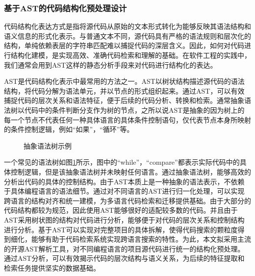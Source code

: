 \documentclass[UTF8,a4paper,12pt]{ctexart}
\numberwithin{equation}{section}
\begin{document}
\subsubsection{基于AST的代码结构化预处理设计}
代码结构化表达方式是指将源代码从原始的文本形式转化为能够反映其语法结构和语义信息的形式化表示。与普通文本不同，源代码具有严格的语法规则和层次化的结构，单纯依赖表层的字符串匹配难以捕捉代码的深层含义。因此，如何对代码进行结构化建模，是实现高效、准确代码检索和理解的基础。在软件工程的实践中，我们通常会用到AST这样的静态分析手段来对代码进行结构化的表达。\par
AST是代码结构化表示中最常用的方法之一。AST以树状结构描述源代码的语法结构，将代码分解为语法单元，并以节点的形式组织起来。通过AST，可以有效捕捉代码的层次关系和语法特征，便于后续的代码分析、转换和检索。通常抽象语法树以代码中的条件判断分支作为树的节点，之所以说AST是抽象的因为树上的每一个节点不代表任何一种具体语言的具体条件控制语句，仅代表节点本身所映射的条件控制逻辑，例如“如果”，“循环”等。\par
\begin{figure}[H]
	\caption{抽象语法树示例}
	\label{ast}
\end{figure}
一个常见的语法树如图\ref{ast}所示，图中的“while”，“compare”都表示实际代码中的具体控制逻辑，但是该抽象语法树并未映射任何语言。通过抽象语法树，能够高效的分析出代码的具体的控制结构。由于AST本质上是一种抽象的语法表示，不依赖于具体编程语言的语法细节。通过对不同语言的AST进行归一化处理，可以实现跨语言的结构对齐和统一建模，为多语言代码检索和迁移提供基础。由于大部分的代码结构都较为规范，因此使用AST能够很好的适配较多数的代码。并且由于AST采用树状图的结构对代码进行分析，能够便于对代码的层次关系和控制结构进行分析。基于AST可以实现对完整项目的具体拆解，使得代码搜索的颗粒度得到细化，能够有助于代码检索系统实现跨语言搜索的特性。为此，本文拟采用主流的开源AST解析工具，对不同编程语言的项目源代码进行统一的结构化预处理。通过AST分析，可以有效揭示代码的层次结构与语义关系，为后续的特征提取和检索任务提供坚实的数据基础。\par
\end{document}
